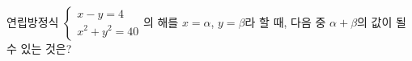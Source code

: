 연립방정식 $\begin{cases} x-y=4 \\ x^2+y^2=40 \end{cases}$의 해를 $x=\alpha$, $y=\beta$라 할 때, 다음 중 $\alpha+\beta$의 값이 될 수 있는 것은?
